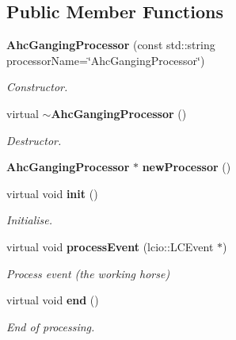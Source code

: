 \subsection*{Public Member Functions}
\begin{DoxyCompactItemize}
\item 
{\bf Ahc\-Ganging\-Processor} (const std\-::string processor\-Name=\char`\"{}Ahc\-Ganging\-Processor\char`\"{})\label{classCALICE_1_1AhcGangingProcessor_ac8b6e29deceb4b308b60faa647ccc7e1}

\begin{DoxyCompactList}\small\item\em Constructor. \end{DoxyCompactList}\item 
virtual {\bf $\sim$\-Ahc\-Ganging\-Processor} ()\label{classCALICE_1_1AhcGangingProcessor_a7db28e81275a852ddf7cf10adc78551e}

\begin{DoxyCompactList}\small\item\em Destructor. \end{DoxyCompactList}\item 
{\bf Ahc\-Ganging\-Processor} $\ast$ {\bfseries new\-Processor} ()\label{classCALICE_1_1AhcGangingProcessor_a8fd201ebf38f37964a48e8a672dd8ca5}

\item 
virtual void {\bf init} ()\label{classCALICE_1_1AhcGangingProcessor_a520226589cd39a8d8a1b2160858710b7}

\begin{DoxyCompactList}\small\item\em Initialise. \end{DoxyCompactList}\item 
virtual void {\bf process\-Event} (lcio\-::\-L\-C\-Event $\ast$)\label{classCALICE_1_1AhcGangingProcessor_aaa02bbdc53f1390652d99b909e909348}

\begin{DoxyCompactList}\small\item\em Process event (the working horse) \end{DoxyCompactList}\item 
virtual void {\bf end} ()\label{classCALICE_1_1AhcGangingProcessor_aaaf48bb9209ff61e09b1522cdce9717a}

\begin{DoxyCompactList}\small\item\em End of processing. \end{DoxyCompactList}\end{DoxyCompactItemize}
